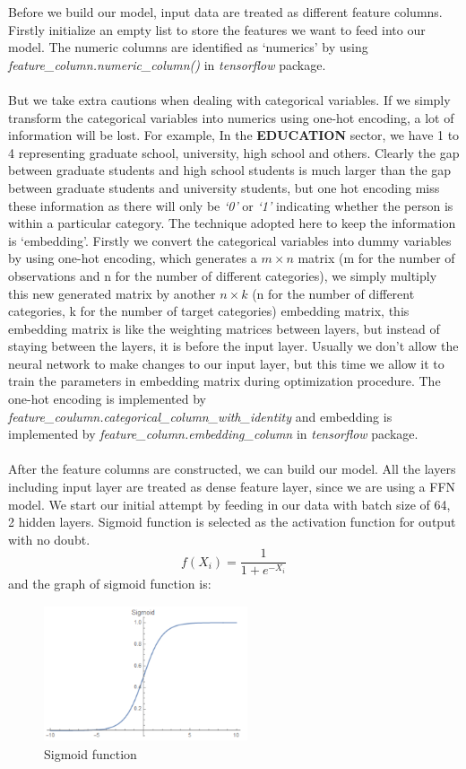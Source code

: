 \documentclass{article}
\begin{document}
Before we build our model, input data are treated as different feature columns. Firstly initialize an empty list to store the features we want to feed into our model. The numeric columns are identified as ‘numerics’ by using \textit{feature\_column.numeric\_column()} in \textit{tensorflow} package. \\ \\
But we take extra cautions when dealing with categorical variables. If we simply transform the categorical variables into numerics using one-hot encoding, a lot of information will be lost. For example, In the \textbf{EDUCATION} sector, we have 1 to 4 representing graduate school, university, high school and others. Clearly the gap between graduate students and high school students is much larger than the gap between graduate students and university students, but one hot encoding miss these information as there will only be \textit{‘0’} or \textit{‘1’} indicating whether the person is within a particular category. The technique adopted here to keep the information is ‘embedding’\cite{embedding}. Firstly we convert the categorical variables into dummy variables by using one-hot encoding, which generates a $m \times n$ matrix (m for the number of observations and n for the number of different categories), we simply multiply this new generated matrix by another $n \times k$ (n for the number of different categories, k for the number of target categories) embedding matrix, this embedding matrix is like the weighting matrices between layers, but instead of staying between the layers, it is before the input layer. Usually we don’t allow the neural network to make changes to our input layer, but this time we allow it to train the parameters in embedding matrix during optimization procedure. The one-hot encoding is implemented by 
\textit{feature\_coulumn.categorical\_column\_with\_identity} and embedding is implemented by  \textit{feature\_column.embedding\_column} in \textit{tensorflow} package.\\ \\

After the feature columns are constructed, we can build our model. All the layers including input layer are treated as dense feature layer, since we are using a FFN model. We start our initial attempt by feeding in our data with batch size of 64, 2 hidden layers. Sigmoid function is selected as the activation function for output with no doubt. 
\begin{equation}
f(X_i)=\frac{1}{1+e^{-X_i}}
\end{equation}  and the graph of sigmoid function is:
\begin{figure}[h]
 \centering
 \includegraphics[width=6cm, height=4cm]{sigmoid.png}
 \caption{Sigmoid function}
\end{figure}
\end{document}
